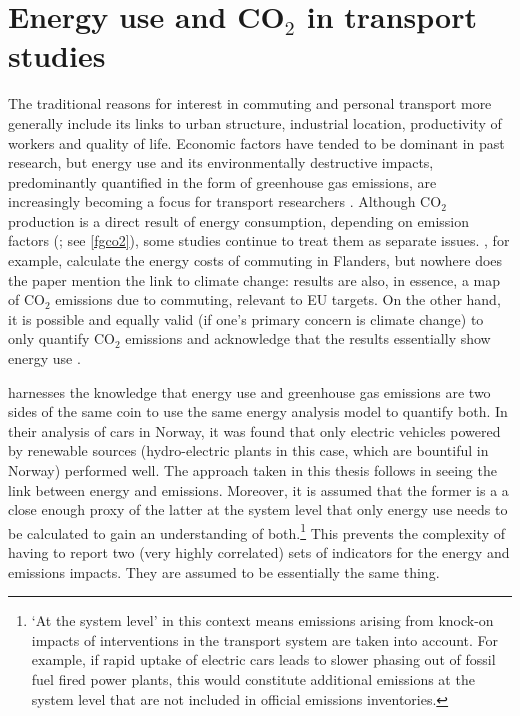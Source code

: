\section{Energy use and CO$_2$ in transport studies}
\label{s:energy}
The traditional reasons for interest in commuting and  personal transport
more generally include its links to urban structure, industrial location,
productivity of workers and  quality of life. Economic factors have
tended to be dominant in past research,
but energy use and its environmentally destructive impacts,
predominantly quantified in the form of greenhouse gas emissions,
are increasingly becoming a focus for transport researchers \citep{Chapman2007}.
Although CO$_2$ production is a direct result of energy consumption,
depending on emission factors (\citealp{Defra2011}; see \cref{fgco2}), some studies continue to
treat them as separate issues. \citet{Boussauw2009}, for example,
calculate the energy costs of commuting in Flanders, but nowhere does
the paper mention the link to climate change: results are also, in essence,
a map of CO$_2$ emissions due to commuting, relevant to EU targets.
On the other hand,
it is possible and equally valid (if one's primary concern is climate change)
to only quantify CO$_2$ emissions and acknowledge
that the results essentially show energy use \citep{smith2011polycentricity}.

\citet{Simonsen2011} harnesses the knowledge that energy use
and greenhouse gas emissions are two sides of the same coin to use the
same energy analysis model to quantify both. In their analysis of cars in Norway,
it was found that only electric vehicles powered by renewable
sources (hydro-electric plants in this case, which are bountiful in Norway)
performed well. The approach taken in this thesis follows
\citet{Simonsen2011} in seeing the link
between energy and emissions.
Moreover, it is assumed that the former is a a close enough proxy of the latter
at the system level that only energy use needs to be
calculated to gain an understanding of
both.\footnote{`At
the system level'
in this context means emissions arising from knock-on impacts of
interventions in the transport system are taken into account.
For example, if rapid uptake of electric cars leads to slower phasing
out of fossil fuel fired power plants, this would constitute
additional emissions at the system level that are not included in
official emissions inventories.
}
This prevents the complexity of having to report two (very highly correlated)
sets of indicators for the energy and emissions impacts. They are assumed to
be essentially the same thing.

